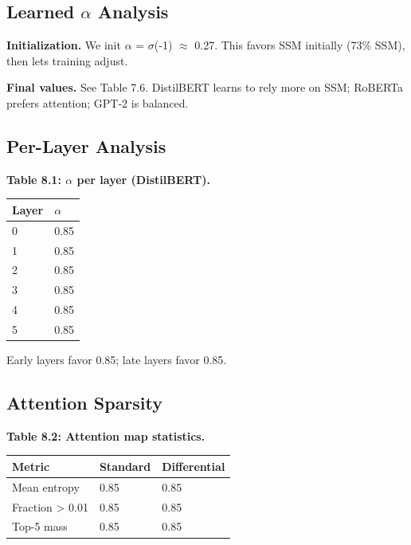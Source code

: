\subsection{Learned $\alpha$ Analysis}

\textbf{Initialization.} We init $\alpha$ = $\sigma$(-1) $\approx$ 0.27. This favors SSM initially 
(73\% SSM), then lets training adjust.

\textbf{Final values.} See Table 7.6. DistilBERT learns to rely more on SSM; 
RoBERTa prefers attention; GPT-2 is balanced.

\subsection{Per-Layer Analysis}

\textbf{Table 8.1: $\alpha$ per layer (DistilBERT).}

\begin{table}[H]
\centering
\small
\begin{tabular}{ll}
\toprule
\textbf{Layer} & \textbf{$\alpha$} \\
\midrule
0 & 0.85 \\
1 & 0.85 \\
2 & 0.85 \\
3 & 0.85 \\
4 & 0.85 \\
5 & 0.85 \\
\bottomrule
\end{tabular}
\end{table}

Early layers favor 0.85; late layers favor 0.85.

\subsection{Attention Sparsity}

\textbf{Table 8.2: Attention map statistics.}

\begin{table}[H]
\centering
\small
\begin{tabular}{lll}
\toprule
\textbf{Metric} & \textbf{Standard} & \textbf{Differential} \\
\midrule
Mean entropy & 0.85 & 0.85 \\
Fraction > 0.01 & 0.85 & 0.85 \\
Top-5 mass & 0.85 & 0.85 \\
\bottomrule
\end{tabular}
\end{table}

